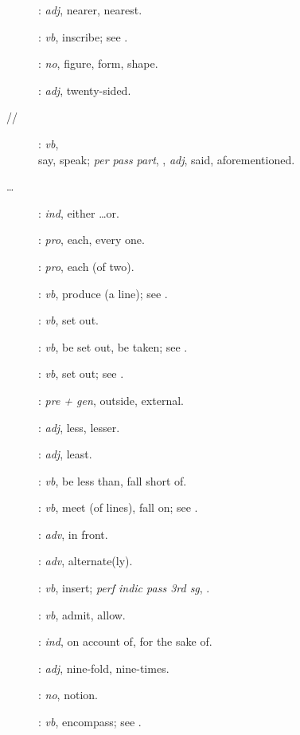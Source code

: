 {\begin{description}
\item[]: {\em adj}, nearer, nearest.
\item[]: {\em vb}, inscribe; see .
\item[]: {\em no}, figure, form, shape.
\item[]: {\em adj}, twenty-sided.
\item[//]: {\em vb},\\  say, speak; {\em per pass part}, , {\em adj}, said, aforementioned.
\item[ \ldots {}]: {\em ind}, either \ldots or.
\item[]: {\em pro}, each, every one.
\item[]: {\em pro}, each (of two).
\item[]: {\em vb},  produce (a line); see . 
\item[]: {\em vb}, set out.
\item[]: {\em vb}, be set out, be taken; see .
\item[]: {\em vb}, set out; see .
\item[]: {\em pre + gen}, outside, external.
\item[]: {\em adj}, less, lesser.
\item[]: {\em adj}, least.
\item[]: {\em vb}, be less than, fall short of.
\item[]: {\em vb}, meet (of lines), fall on; see .
\item[]: {\em adv}, in front.
\item[]: {\em adv}, alternate(ly).
\item[]: {\em vb}, insert; {\em perf indic pass 3rd sg}, .
\item[]: {\em vb}, admit, allow.
\item[]: {\em ind}, on account of, for the sake of.
\item[]: {\em adj}, nine-fold, nine-times.
\item[]: {\em no}, notion.
\item[]: {\em vb}, encompass; see .

\end{description}}
